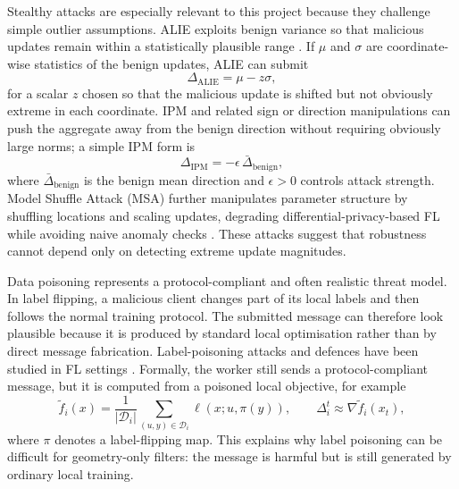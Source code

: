 Stealthy attacks are especially relevant to this project because they challenge
simple outlier assumptions. ALIE exploits benign variance so that malicious
updates remain within a statistically plausible range \cite{BarBarGol:19}. If
\(\mu\) and \(\sigma\) are coordinate-wise statistics of the benign updates,
ALIE can submit
\begin{equation}
    \Delta_{\mathrm{ALIE}} = \mu - z\sigma ,
    \label{eq:related-alie}
\end{equation}
for a scalar \(z\) chosen so that the malicious update is shifted but not
obviously extreme in each coordinate. IPM and related sign or direction
manipulations can push the aggregate away from the benign direction without
requiring obviously large norms; a simple IPM form is
\begin{equation}
    \Delta_{\mathrm{IPM}} = -\epsilon\,\bar{\Delta}_{\mathrm{benign}},
    \label{eq:related-ipm}
\end{equation}
where \(\bar{\Delta}_{\mathrm{benign}}\) is the benign mean direction and
\(\epsilon>0\) controls attack strength. Model Shuffle Attack (MSA) further
manipulates parameter structure by shuffling locations and scaling updates,
degrading differential-privacy-based FL while avoiding naive anomaly checks
\cite{YANG2023158}. These attacks suggest that robustness cannot depend only on
detecting extreme update magnitudes.

Data poisoning represents a protocol-compliant and often realistic threat model. In
label flipping, a malicious client changes part of its local labels and then
follows the normal training protocol. The submitted message can therefore look
plausible because it is produced by standard local optimisation rather than by
direct message fabrication. Label-poisoning attacks and defences have been
studied in FL settings
\cite{10.1007/978-3-030-58951-6_24,9897807}.
Formally, the worker still sends a protocol-compliant message, but it is computed
from a poisoned local objective, for example
\begin{equation}
    \tilde{f}_i(x)
    = \frac{1}{|\mathcal{D}_i|}
      \sum_{(u,y)\in \mathcal{D}_i}
      \ell(x;u,\pi(y)),
    \qquad
    \Delta_i^t \approx \nabla \tilde{f}_i(x_t),
    \label{eq:related-label-poisoning}
\end{equation}
where \(\pi\) denotes a label-flipping map. This explains why label poisoning
can be difficult for geometry-only filters: the message is harmful but is still
generated by ordinary local training.

